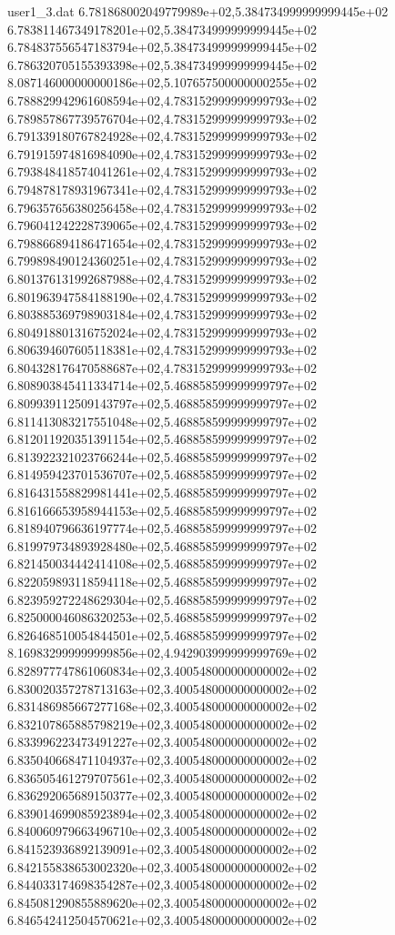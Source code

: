 \begin{filecontents}{user1_3.dat}
6.781868002049779989e+02,5.384734999999999445e+02
6.783811467349178201e+02,5.384734999999999445e+02
6.784837556547183794e+02,5.384734999999999445e+02
6.786320705155393398e+02,5.384734999999999445e+02
8.087146000000000186e+02,5.107657500000000255e+02
6.788829942961608594e+02,4.783152999999999793e+02
6.789857867739576704e+02,4.783152999999999793e+02
6.791339180767824928e+02,4.783152999999999793e+02
6.791915974816984090e+02,4.783152999999999793e+02
6.793848418574041261e+02,4.783152999999999793e+02
6.794878178931967341e+02,4.783152999999999793e+02
6.796357656380256458e+02,4.783152999999999793e+02
6.796041242228739065e+02,4.783152999999999793e+02
6.798866894186471654e+02,4.783152999999999793e+02
6.799898490124360251e+02,4.783152999999999793e+02
6.801376131992687988e+02,4.783152999999999793e+02
6.801963947584188190e+02,4.783152999999999793e+02
6.803885369798903184e+02,4.783152999999999793e+02
6.804918801316752024e+02,4.783152999999999793e+02
6.806394607605118381e+02,4.783152999999999793e+02
6.804328176470588687e+02,4.783152999999999793e+02
6.808903845411334714e+02,5.468858599999999797e+02
6.809939112509143797e+02,5.468858599999999797e+02
6.811413083217551048e+02,5.468858599999999797e+02
6.812011920351391154e+02,5.468858599999999797e+02
6.813922321023766244e+02,5.468858599999999797e+02
6.814959423701536707e+02,5.468858599999999797e+02
6.816431558829981441e+02,5.468858599999999797e+02
6.816166653958944153e+02,5.468858599999999797e+02
6.818940796636197774e+02,5.468858599999999797e+02
6.819979734893928480e+02,5.468858599999999797e+02
6.821450034442414108e+02,5.468858599999999797e+02
6.822059893118594118e+02,5.468858599999999797e+02
6.823959272248629304e+02,5.468858599999999797e+02
6.825000046086320253e+02,5.468858599999999797e+02
6.826468510054844501e+02,5.468858599999999797e+02
8.169832999999999856e+02,4.942903999999999769e+02
6.828977747861060834e+02,3.400548000000000002e+02
6.830020357278713163e+02,3.400548000000000002e+02
6.831486985667277168e+02,3.400548000000000002e+02
6.832107865885798219e+02,3.400548000000000002e+02
6.833996223473491227e+02,3.400548000000000002e+02
6.835040668471104937e+02,3.400548000000000002e+02
6.836505461279707561e+02,3.400548000000000002e+02
6.836292065689150377e+02,3.400548000000000002e+02
6.839014699085923894e+02,3.400548000000000002e+02
6.840060979663496710e+02,3.400548000000000002e+02
6.841523936892139091e+02,3.400548000000000002e+02
6.842155838653002320e+02,3.400548000000000002e+02
6.844033174698354287e+02,3.400548000000000002e+02
6.845081290855889620e+02,3.400548000000000002e+02
6.846542412504570621e+02,3.400548000000000002e+02

\end{filecontents}
